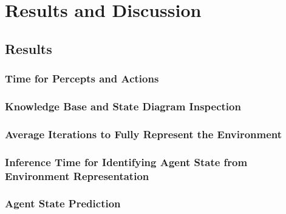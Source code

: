 





\chapter{Results and Discussion} 
\label{Results_and_Discussion}

\section{Results}


\subsection{Time for Percepts and Actions}




\subsection{Knowledge Base and State Diagram Inspection}




\subsection{Average Iterations to Fully Represent the Environment}


\subsection{Inference Time for Identifying Agent State from Environment Representation}



\subsection{Agent State Prediction}



